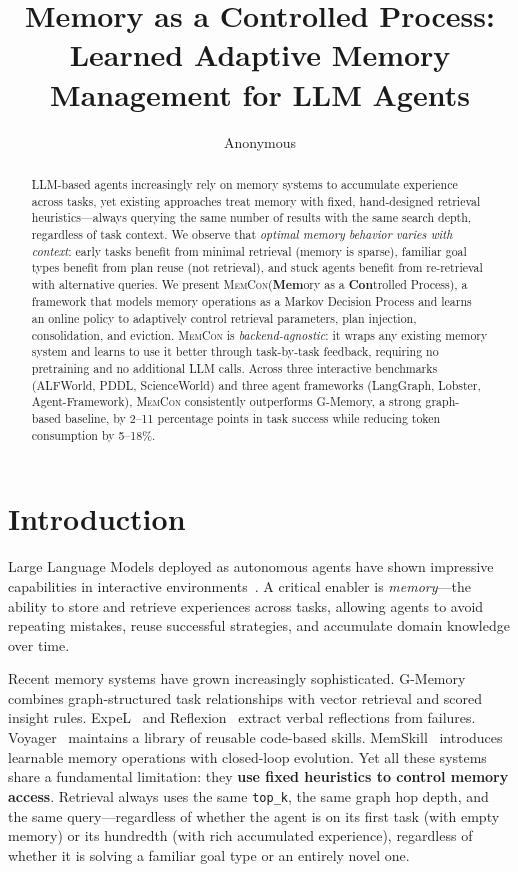 \documentclass{article} %
\title{Memory as a Controlled Process: Learned Adaptive Memory Management for LLM Agents}
\author{Anonymous}
\theoremstyle{plain}
\theoremstyle{definition}
\theoremstyle{remark}
\newcommand{\ours}{\textsc{MemCon}\xspace}
\begin{document}
\maketitle

\begin{abstract}
LLM-based agents increasingly rely on memory systems to accumulate experience across tasks, yet existing approaches treat memory with fixed, hand-designed retrieval heuristics---always querying the same number of results with the same search depth, regardless of task context.
We observe that \emph{optimal memory behavior varies with context}: early tasks benefit from minimal retrieval (memory is sparse), familiar goal types benefit from plan reuse (not retrieval), and stuck agents benefit from re-retrieval with alternative queries.
We present \ours (\textbf{Mem}ory as a \textbf{Con}trolled Process), a framework that models memory operations as a Markov Decision Process and learns an online policy to adaptively control retrieval parameters, plan injection, consolidation, and eviction.
\ours is \emph{backend-agnostic}: it wraps any existing memory system and learns to use it better through task-by-task feedback, requiring no pretraining and no additional LLM calls.
Across three interactive benchmarks (ALFWorld, PDDL, ScienceWorld) and three agent frameworks (LangGraph, Lobster, Agent-Framework), \ours consistently outperforms G-Memory, a strong graph-based baseline, by 2--11 percentage points in task success while reducing token consumption by 5--18\%.
\end{abstract}


\section{Introduction}
\label{sec:intro}

Large Language Models deployed as autonomous agents have shown impressive capabilities in interactive environments~\citep{yao2023react,wang2024survey}.
A critical enabler is \emph{memory}---the ability to store and retrieve experiences across tasks, allowing agents to avoid repeating mistakes, reuse successful strategies, and accumulate domain knowledge over time.

Recent memory systems have grown increasingly sophisticated.
G-Memory~\citep{gmemory} combines graph-structured task relationships with vector retrieval and scored insight rules.
ExpeL~\citep{zhao2024expel} and Reflexion~\citep{shinn2023reflexion} extract verbal reflections from failures.
Voyager~\citep{wang2023voyager} maintains a library of reusable code-based skills.
MemSkill~\citep{memskill} introduces learnable memory operations with closed-loop evolution.
Yet all these systems share a fundamental limitation: they \textbf{use fixed heuristics to control memory access}.
Retrieval always uses the same \texttt{top\_k}, the same graph hop depth, and the same query---regardless of whether the agent is on its first task (with empty memory) or its hundredth (with rich accumulated experience), regardless of whether it is solving a familiar goal type or an entirely novel one.
\end{document}
